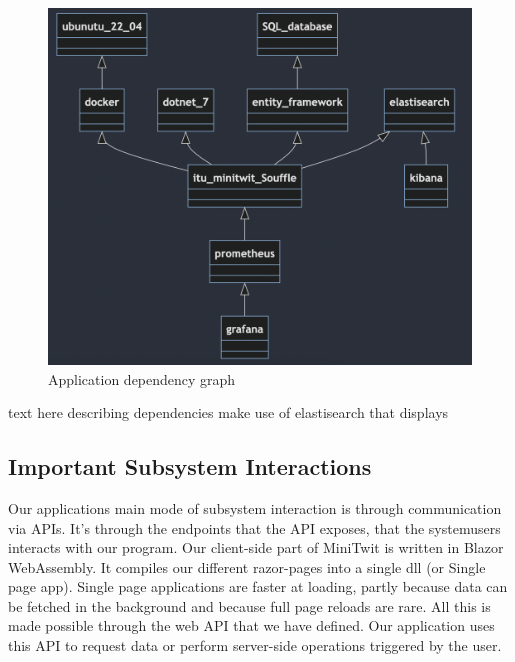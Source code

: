 \begin{figure}
    \includegraphics[width=0.9\linewidth]{Images/application_dependencies.png} 
    \caption{Application dependency graph}
    \label{fig:ApplicationDependencyGraph}
\end{figure}

text here describing dependencies
make use of elastisearch that displays 



\subsection{Important Subsystem Interactions}

Our applications main mode of subsystem interaction is through communication via APIs. It's through the endpoints that the API exposes, that the systemusers interacts with our program. Our client-side part of MiniTwit is written in Blazor WebAssembly. It compiles our different razor-pages into a single dll (or Single page app). Single page applications are faster at loading, partly because data can be fetched in the background and because full page reloads are rare. All this is made possible through the web API that we have defined. Our application uses this API to request data or perform server-side operations triggered by the user.  



